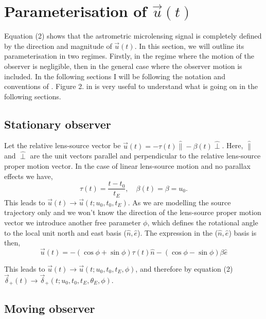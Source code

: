 \documentclass[11pt]{article}
\begin{document}
\section{Parameterisation of $\vec{u}(t)$}
%
Equation (2) shows that the astrometric microlensing signal is completely
defined by the direction and magnitude of $\vec{u}(t)$. In this section, we will outline
its parameterisation in two regimes. Firstly, in the regime where the motion of the observer
is negligible, then in the general case where the observer motion is included. In the 
following sections I will be following the notation and conventions of \cite{Gould04}.
Figure 2. in \cite{Gould04} is very useful to understand what is going on in the 
following sections.

\subsection{Stationary observer}

Let the relative lens-source vector be $\vec{u}(t) = -\tau(t)\hat{\parallel}-\beta(t)\hat{\perp}$.
Here, $\hat{\parallel}$ and $\hat{\perp}$ are the unit vectors parallel and perpendicular to
the relative lens-source proper motion vector.  In the case
of linear lens-source motion and no parallax effects we have,
%
\begin{equation}
\tau(t) = \frac{t-t_{0}}{t_{E}}, \quad \beta(t) = \beta
        = u_{0}.
\end{equation}
%
This leads to $\vec{u}(t) \to \vec{u}(t;u_{0},t_{0},t_{E})$. As we are modelling the source
trajectory only and we won't know the direction of the lens-source proper motion vector 
we introduce another free parameter $\phi$, which defines the rotational angle to 
the local unit north and east basis ($\hat{n},\hat{e}$). The expression in the 
($\hat{n},\hat{e}$) basis is then,
%
\begin{equation}
\vec{u}(t) = -(\cos\phi+\sin\phi)\tau(t)\hat{n} - (\cos\phi-\sin\phi)\beta\hat{e}
\end{equation}

This leads to 
$\vec{u}(t) \to \vec{u}(t;u_{0},t_{0},t_{E},\phi)$, and therefore
by equation (2) $\vec{\delta}_{+}(t) \to \vec{\delta}_{+}(t;u_{0},t_{0},t_{E},\theta_{E},\phi)$.

\subsection{Moving observer}
\end{document}
